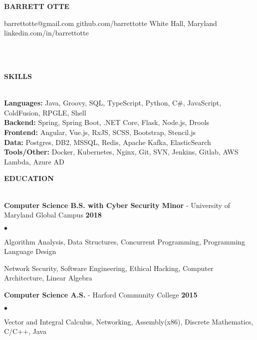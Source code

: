 \documentclass{article}
\newcommand{\lineunder}{
	\vspace*{-4pt}\\ 
	\hspace*{-18pt}\hrulefill \\
}
\newcommand{\header}[1]{
	{\hspace*{-15pt}\vspace*{6pt}\textsc{#1}}\vspace*{-6pt}\lineunder
}
\newcommand{\contact}[5]{
	\begin{center}
		{\Large \textbf \scshape \bfseries{#1}}
	\end{center}
	\small{#2} \hfill \small{#3} \break
	\small{#4} \hfill \small{#5} \break
	\vspace*{-6pt}
	\lineunder
	\vspace*{-6pt}
}
\newcommand{\education}[3]{
	\textbf{#1} - #2 \hfill \textbf{#3} \vspace*{3pt}
}
\newenvironment{resumelist}{
	\vspace*{2pt}
	\begin{list}
		{\small$\bullet$}{\topsep 0pt \itemsep -2pt}}{\vspace*{4pt}
	\end{list}
}
\newcommand{\resumeheader}[1]{
	\vspace*{14pt}
	\header{\textbf{#1}}
    \vspace*{5pt}
}
\begin{document}
	\normalsize
	\smallskip
	\vspace*{-44pt}

	\contact
		{BARRETT OTTE}
		{barrettotte@gmail.com}
		{github.com/barrettotte}
		{White Hall, Maryland}
		{linkedin.com/in/barrettotte}

	\resumeheader{SKILLS}
		\textbf{Languages:}
			Java, Groovy, SQL, TypeScript, Python, C\#, JavaScript, ColdFusion, RPGLE, Shell\\
			\vspace*{5pt}
        \textbf{Backend:}
			Spring, Spring Boot, .NET Core, Flask, Node.js, Drools\\
			\vspace*{5pt}
		\textbf{Frontend:}
			Angular, Vue.js, RxJS, SCSS, Bootstrap, Stencil.js\\
			\vspace*{5pt}
        \textbf{Data:}
			Postgres, DB2, MSSQL, Redis, Apache Kafka, ElasticSearch\\
			\vspace*{5pt}
		\textbf{Tools/Other:}
			Docker, Kubernetes, Nginx, Git, SVN, Jenkins, Gitlab, AWS Lambda, Azure AD\\
			\vspace*{5pt}

	\resumeheader{EDUCATION}
		\education 
			{Computer Science B.S. with Cyber Security Minor}{University of Maryland Global Campus} 
			{2018}
            \begin{resumelist}
                \item Algorithm Analysis, Data Structures, Concurrent Programming, Programming Language Design
                \item Network Security, Software Engineering, Ethical Hacking, Computer Architecture, Linear Algebra
            \end{resumelist}
            \vspace*{6pt}
		\education
			{Computer Science A.S.}{Harford Community College}
			{2015}
            \begin{resumelist}
                \item Vector and Integral Calculus, Networking, Assembly(x86), Discrete Mathematics, C/C++, Java
            \end{resumelist}
\end{document}
